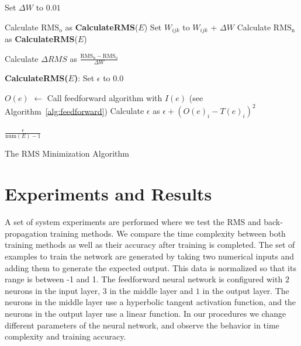 \documentclass[11pt]{article}
\begin{document}
\begin{algorithm}%
\dontprintsemicolon
{}
Set $\Delta W$ to $0.01$\;
\SetLine
{}
{
	{
		{
				{
					Calculate $\mbox{RMS}_{\mbox{o}}$ as \textbf{CalculateRMS}($E$)\;
					Set $W_{ijk}$ to $W_{ijk}$ + $\Delta W$\;
					Calculate $\mbox{RMS}_{\mbox{n}}$ as \textbf{CalculateRMS}($E$)\;
				
					Calculate $\Delta RMS$ as $ \frac{\mbox{RMS}_{\mbox{n}}-\mbox{RMS}_{\mbox{o}}}{\Delta W} $\;
				
				}
		}
	}
}

\textbf{CalculateRMS($E$)}:
\dontprintsemicolon
{} 
Set $\epsilon$ to $0.0$\;
{
	$O(e)$ $\leftarrow$  Call feedforward algorithm with $I(e)$ (see Algorithm~\ref{alg:feedforward})\;
	{
		Calculate $\epsilon$ as $\epsilon + (O(e)_{i} - T(e)_{i})^{2}$\;
	} 
	
}
\Return $\frac{\epsilon}{\mbox{num}(E) - 1}$ 
\vspace{5mm}
\caption{The RMS Minimization Algorithm}
\label{alg:RMSminimization}
\end{algorithm}




\section{Experiments and Results} %
\label{sec:results}

A set of system experiments are performed where we test the RMS and back-propagation training methods. We compare the time complexity
between both training methods as well as their accuracy after training is completed. The set of examples to train the network are
generated by taking two numerical inputs and adding them to generate the expected output. This data is normalized so that its range is
between -1 and 1. The feedforward neural network is configured with $2$ neurons in the input layer, $3$ in the middle layer and $1$ in
the output layer. The neurons in the middle layer use a hyperbolic tangent activation function, and the neurons in the output layer use
a linear function. In our procedures we change different parameters of the neural network, and observe the behavior in time complexity
and training accuracy.
\end{document}
